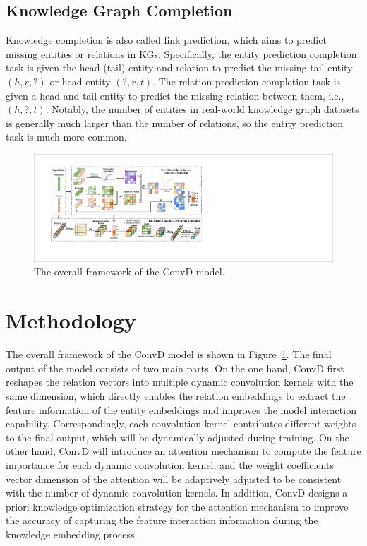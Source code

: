 \documentclass[letterpaper]{article} %
\begin{document}
\subsection{Knowledge Graph Completion} 
Knowledge completion is also called link prediction, which aims to predict missing entities or relations in KGs. Specifically, the entity prediction completion task is given the head (tail) entity and relation to predict the missing tail entity $(h, r, ?)$ or head entity $(?, r, t)$. The relation prediction completion task is given a head and tail entity to predict the missing relation between them, i.e., $(h, ?, t)$. Notably, the number of entities in real-world knowledge graph datasets is generally much larger than the number of relations, so the entity prediction task is much more common.

\begin{figure}[!t]
\centering
\includegraphics[width=166mm]{figure/ConvD_Model.pdf}
\caption{The overall framework of the ConvD model.}
\label{fig:model}
\end{figure}


\section{Methodology}
The overall framework of the ConvD model is shown in Figure~\ref{fig:model}. The final output of the model consists of two main parts. On the one hand, ConvD first reshapes the relation vectors into multiple dynamic convolution kernels with the same dimension, which directly enables the relation embeddings to extract the feature information of the entity embeddings and improves the model interaction capability. Correspondingly, each convolution kernel contributes different weights to the final output, which will be dynamically adjusted during training. On the other hand, ConvD will introduce an attention mechanism to compute the feature importance for each dynamic convolution kernel, and the weight coefficients vector dimension of the attention will be adaptively adjusted to be consistent with the number of dynamic convolution kernels. In addition, ConvD designs a priori knowledge optimization strategy for the attention mechanism to improve the accuracy of capturing the feature interaction information during the knowledge embedding process.
\end{document}
